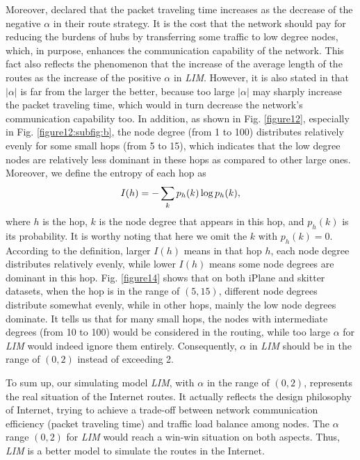 \documentclass[a4paper]{llncs}
\begin{document}
Moreover, \cite{TrafficDynamicLocal,EfficientRouting}
declared that the packet traveling time increases as the decrease of the negative $\alpha$ in their route
strategy. It is the cost that the network should pay for reducing the burdens of hubs by transferring some traffic to low degree nodes, which, in purpose, enhances the communication capability of the network. This fact also reflects the phenomenon that the increase of the average length of the routes as the increase of the positive $\alpha$ in \textit{LIM}.
However, it is also stated in \cite{TrafficDynamicLocal,EfficientRouting} that $|\alpha|$ is far from the larger the better, because too large $|\alpha|$ may sharply increase the packet traveling time, which would in turn decrease the network's communication capability too. In addition, as shown in Fig. \ref{figure12}, especially in Fig. \ref{figure12:subfig:b}, the node degree (from 1 to 100) distributes relatively evenly for some small hops (from 5 to 15), which indicates that the low degree nodes are relatively less dominant in these hops as compared to other large ones. Moreover, we define the entropy of each hop as
\begin{equation}
\label{eq:entropy}
I(h)=-\sum_{k}{p_h(k)\log{p_h(k)}},
\vspace{-0.5em}
\end{equation}
where $h$ is the hop, $k$ is the node degree that appears in this hop, and $p_h(k)$ is its probability. It is worthy noting that here we omit the $k$ with $p_h(k)=0$. According to the definition, larger $I(h)$ means in that hop $h$, each node degree distributes relatively evenly, while lower $I(h)$ means some node degrees are dominant in this hop. Fig. \ref{figure14} shows that on both iPlane and skitter datasets, when the hop is in the range of $(5,15)$, different node degrees distribute somewhat evenly, while in other hops, mainly the low node degrees dominate. It tells us that for many small hops, the nodes with intermediate degrees (from 10 to 100) would be considered in the routing, while too large $\alpha$ for \textit{LIM} would indeed ignore them entirely. Consequently, $\alpha$ in \textit{LIM} should be in the range of $(0,2)$ instead of exceeding 2.

To sum up, our simulating model \textit{LIM}, with $\alpha$ in the range of $(0,2)$, represents the real situation of the
Internet routes. It actually reflects the design philosophy of Internet, trying to achieve a trade-off between network communication efficiency (packet traveling time) and traffic load balance among nodes. The $\alpha$ range $(0,2)$ for \textit{LIM} would reach a win-win situation on both aspects. Thus, \textit{LIM} is a better model to simulate the routes in the Internet.
\end{document}
